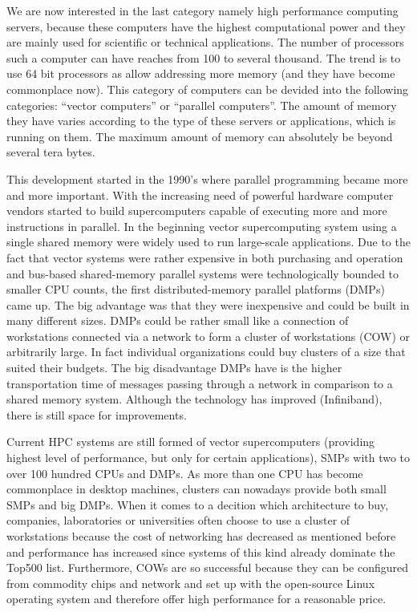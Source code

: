 We are now interested in the last category namely high performance
computing servers, because these computers have the highest
computational power and they are mainly used
for scientific or technical applications. The number of processors
such a computer can have reaches from 100 to several thousand. The
trend is to use 64 bit processors as allow addressing more memory (and
they have become commonplace now). 
This category of computers can be devided into the following
categories: ``vector computers'' or ``parallel computers''.
The amount of memory they have varies according to the type of
these servers or applications, which is running on them. The maximum
amount of memory can absolutely be beyond several tera bytes.  

This development started in the 1990's where parallel programming 
became more and more important. With the increasing need of powerful
hardware computer vendors started to build supercomputers capable of
executing more and more instructions in parallel. In the beginning
vector supercomputing system using a single shared memory were widely
used to run large-scale applications. Due to the fact that vector
systems were rather expensive in both purchasing and operation and
bus-based shared-memory parallel systems were technologically bounded
to smaller CPU counts, the first distributed-memory parallel platforms (DMPs)
came up. The big advantage was that they were inexpensive and could be
built in many different sizes. DMPs could be rather small like a
connection of workstations connected via a network to form a cluster of
workstations (COW) or arbitrarily large. In fact individual
organizations could buy clusters of a size that suited their
budgets. The big disadvantage DMPs have is the higher transportation
time of messages passing through a network in comparison to a shared
memory system. Although the technology has improved (Infiniband), there
is still space for improvements. 

Current HPC systems are still formed of vector supercomputers
(providing highest level of performance, but only for certain
applications), SMPs with two to over 100 hundred CPUs and DMPs. As
more than one CPU has become commonplace in desktop machines, clusters
can nowadays provide both small SMPs and big DMPs. When it comes to a
decition which architecture to buy, companies, laboratories or
universities often choose to use a cluster of workstations because the
cost of networking has decreased as mentioned before and performance
has increased since systems of this kind already dominate the Top500
list. Furthermore, COWs are so successful because they can be
configured from commodity chips and network and set up with the open-source
Linux operating system and therefore offer high performance for a
reasonable price.

